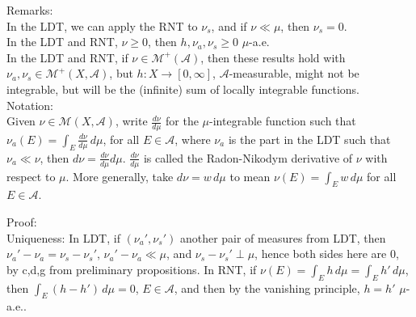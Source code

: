 \documentclass[12pt]{article}
\newcommand{\A}[0] { \mathcal{A} }
\newcommand{\M}[0] { \mathcal{M} }
\newcommand{\rarw}[0] { \rightarrow }
\begin{document}
\vspace{10pt}

\noindent
Remarks:  \\

\noindent
In the LDT, we can apply the RNT to $\nu_s$, and if $\nu \ll \mu$, then $\nu_s = 0$. \\

\noindent
In the LDT and RNT, $\nu \ge 0$, then $h, \nu_a, \nu_s \ge 0$ $\mu$-a.e. \\

\noindent
In the LDT and RNT, if $\nu \in \M^+(\A)$, then these results hold with $\nu_a, \nu_s \in \M^+(X, \A)$, but  $h: X \rarw [0, \infty]$, $\A$-measurable, might not be integrable, but will be the (infinite) sum of locally integrable functions. \\

\noindent
Notation: \\


\noindent
Given $\nu \in \M(X, \A)$, write $\frac{d\nu}{d\mu}$ for the $\mu$-integrable function such that $\nu_a(E) = \int_E \frac{d\nu}{d\mu} \, d\mu$, for all $E \in \A$, where $\nu_a$ is the part in the LDT such that $\nu_a \ll \nu$, then $d\nu =\frac{d\nu}{d\mu} d\mu$. $\frac{d\nu}{d\mu}$ is called the Radon-Nikodym derivative of $\nu$ with respect to $\mu$. More generally, take $d\nu = w \, d\mu$ to mean $\nu(E) = \int_E w \, d\mu$ for all $E \in \A$. \\







\vspace{10pt}


\noindent
Proof: \\

\noindent
Uniqueness: In LDT, if $(\nu_a', \nu_s')$ another pair of measures from LDT, then $\nu_a' - \nu_a = \nu_s - \nu_s'$, $\nu_a' - \nu_a \ll \mu$, and $\nu_s - \nu_s' \perp \mu$, hence both sides here are 0, by c,d,g from preliminary propositions. In RNT, if $ \nu(E) = \int_E h \, d\mu =  \int_E h' \, d\mu $, then $  \int_E (h - h') \, d\mu = 0$, $E \in \A$, and then by the vanishing principle, $h = h'$ $\mu$-a.e.. \\
\end{document}
